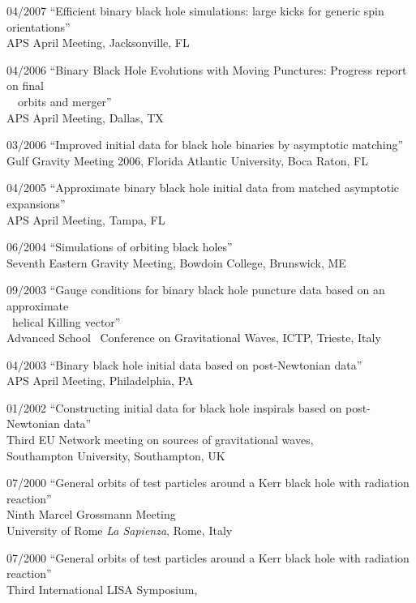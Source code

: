 \documentclass[11pt]{article}
\begin{document}
\begin{list}{}{\leftmargin=5em =1.5em \rightmargin=-8em =7em}
\item[04/2007] ``Efficient binary black hole simulations:
		large kicks for generic spin orientations''\\
		{APS April Meeting, Jacksonville, FL}
\item[04/2006] ``Binary Black Hole Evolutions with Moving Punctures:
		Progress report on final\\
		\ \ orbits and merger''\\
		{APS April Meeting, Dallas, TX}
\item[03/2006] ``Improved initial data for black hole binaries by asymptotic
		matching''\\
                {Gulf Gravity Meeting 2006},
		{Florida Atlantic University, Boca Raton, FL}
\item[04/2005] ``Approximate binary black hole initial data from matched
		asymptotic expansions''\\
		{APS April Meeting, Tampa, FL}
\item[06/2004] ``Simulations of orbiting black holes''\\
                {Seventh Eastern Gravity Meeting},
		{Bowdoin College, Brunswick, ME}
\item[09/2003] ``Gauge conditions for binary black hole puncture data
		based on an approximate\\
		\, helical Killing vector''\\
		{Advanced School \ Conference on Gravitational Waves},
		{ICTP, Trieste, Italy}
\item[04/2003] ``Binary black hole initial data based 
		   on post-Newtonian data''\\
		{APS April Meeting, Philadelphia, PA}
\item[01/2002] ``Constructing initial data for black hole inspirals based on
		post-Newtonian data''\\
		{Third EU Network meeting on sources of gravitational
		      waves},\\
		{Southampton University, Southampton, UK}
\item[07/2000] ``General orbits of test particles around a Kerr black
		hole with radiation reaction''\\
		{Ninth Marcel Grossmann Meeting}\\
		{University of Rome {\em La Sapienza}, Rome, Italy}
\item[07/2000] ``General orbits of test particles around a Kerr black
		hole with radiation reaction''\\
		{Third International LISA Symposium},

\end{list}
\end{document}
